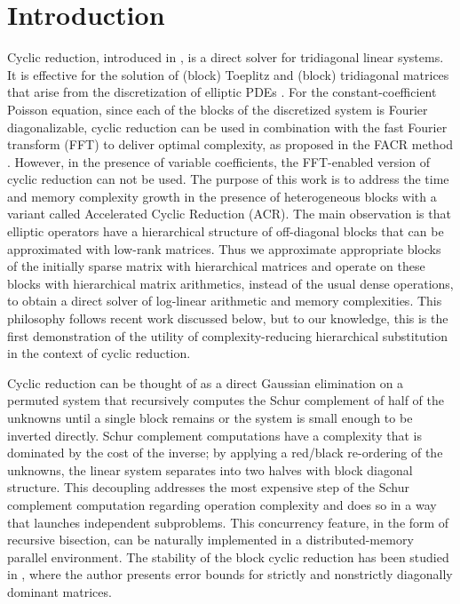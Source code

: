 \documentclass[]{elsarticle}
\begin{document}
\section{Introduction}
\label{sec:introduction}

Cyclic reduction, introduced in \cite{hockney65}, is a direct solver for tridiagonal linear systems. It is effective for the solution of (block) Toeplitz and (block) tridiagonal matrices that arise from the discretization of elliptic PDEs \cite{buzbee70,gander97}. For the constant-coefficient Poisson equation, since each of the blocks of the discretized system is Fourier diagonalizable, cyclic reduction can be used in combination with the fast Fourier transform (FFT) to deliver optimal complexity, as proposed in the FACR method \cite{swarztrauber77}. However, in the presence of variable coefficients, the FFT-enabled version of cyclic reduction can not be used. The purpose of this work is to address the time and memory complexity growth in the presence of heterogeneous blocks with a variant called Accelerated Cyclic Reduction (ACR). The main observation is that elliptic operators have a hierarchical structure of off-diagonal blocks that can be approximated with low-rank matrices. Thus we approximate appropriate blocks of the initially sparse matrix with hierarchical matrices and operate on these blocks with hierarchical matrix arithmetics, instead of the usual dense operations, to obtain a direct solver of log-linear arithmetic and memory complexities. This philosophy follows recent work discussed below, but to our knowledge, this is the first demonstration of the utility of complexity-reducing hierarchical substitution in the context of cyclic reduction.

Cyclic reduction can be thought of as a direct Gaussian elimination on a permuted system that recursively computes the Schur complement of half of the unknowns until a single block remains or the system is small enough to be inverted directly. Schur complement computations have a complexity that is dominated by the cost of the inverse; by applying a red/black re-ordering of the unknowns, the linear system separates into two halves with block diagonal structure.
This decoupling addresses the most expensive step of the Schur complement computation regarding operation complexity and does so in a way that launches independent subproblems. This concurrency feature, in the form of recursive bisection, can be naturally implemented in a distributed-memory parallel environment. The stability of the block cyclic reduction has been studied in \cite{yalamov1996stability}, where the author presents error bounds for strictly and nonstrictly diagonally dominant matrices.
\end{document}
